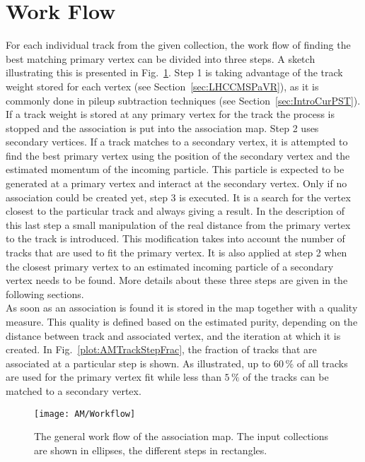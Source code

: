 \section{Work Flow \label{sec:AMWorkflow}}

For each individual track from the given collection, the work flow of finding the best matching primary vertex can be divided into three steps. A sketch illustrating this is presented in Fig.~\ref{plot:AMWorkSketch}. Step 1 is taking advantage of the track weight stored for each vertex (see Section~\ref{sec:LHCCMSPaVR}), as it is commonly done in pileup subtraction techniques (see Section~\ref{sec:IntroCurPST}). If a track weight is stored at any primary vertex for the track the process is stopped and the association is put into the association map. Step 2 uses secondary vertices. If a track matches to a secondary vertex, it is attempted to find the best primary vertex using the position of the secondary vertex and the estimated momentum of the incoming particle. This particle is expected to be generated at a primary vertex and interact at the secondary vertex. Only if no association could be created yet, step 3 is executed. It is a search for the vertex closest to the particular track and always giving a result. In the description of this last step a small manipulation of the real distance from the primary vertex to the track is introduced. This modification takes into account the number of tracks that are used to fit the primary vertex. It is also applied at step 2 when the closest primary vertex to an estimated incoming particle of a secondary vertex needs to be found. More details about these three steps are given in the following sections.  \\
As soon as an association is found it is stored in the map together with a quality measure. This quality is defined based on the estimated purity, depending on the distance between track and associated vertex, and the iteration at which it is created. In Fig.~\ref{plot:AMTrackStepFrac}, the fraction of tracks that are associated at a particular step is shown. As illustrated, up to $60\,\%$ of all tracks are used for the primary vertex fit while less than $5\,\%$ of the tracks can be matched to a secondary vertex.

\begin{figure}[Ht]
    \centering
    \texttt{[image: AM/Workflow]}
    \caption[Sketch of the work flow of the association map]{The general work flow of the association map. The input collections are shown in ellipses, the different steps in rectangles. \label{plot:AMWorkSketch}}
\end{figure}

